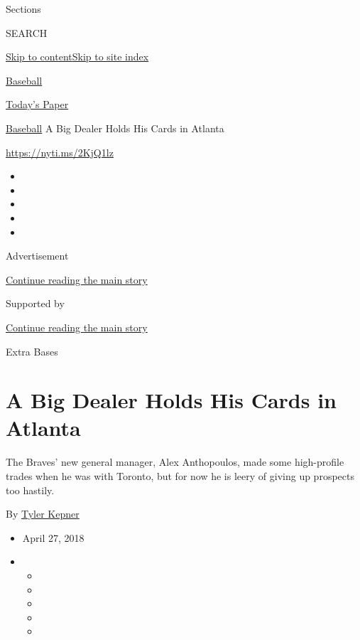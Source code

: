 Sections

SEARCH

\protect\hyperlink{site-content}{Skip to
content}\protect\hyperlink{site-index}{Skip to site index}

\href{https://www.nytimes3xbfgragh.onion/section/sports/baseball}{Baseball}

\href{https://myaccount.nytimes3xbfgragh.onion/auth/login?response_type=cookie\&client_id=vi}{}

\href{https://www.nytimes3xbfgragh.onion/section/todayspaper}{Today's
Paper}

\href{/section/sports/baseball}{Baseball}\textbar{} A Big Dealer Holds
His Cards in Atlanta

\url{https://nyti.ms/2KjQ1lz}

\begin{itemize}
\item
\item
\item
\item
\item
\end{itemize}

Advertisement

\protect\hyperlink{after-top}{Continue reading the main story}

Supported by

\protect\hyperlink{after-sponsor}{Continue reading the main story}

Extra Bases

\hypertarget{a-big-dealer-holds-his-cards-in-atlanta}{%
\section{A Big Dealer Holds His Cards in
Atlanta}\label{a-big-dealer-holds-his-cards-in-atlanta}}

The Braves' new general manager, Alex Anthopoulos, made some
high-profile trades when he was with Toronto, but for now he is leery of
giving up prospects too hastily.

By \href{http://www.nytimes3xbfgragh.onion/by/tyler-kepner}{Tyler
Kepner}

\begin{itemize}
\item
  April 27, 2018
\item
  \begin{itemize}
  \item
  \item
  \item
  \item
  \item
  \end{itemize}
\end{itemize}

